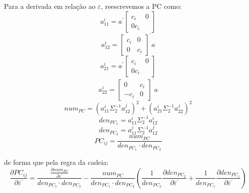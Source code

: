 \documentclass[a4paper,10pt]{article}
\begin{document}
Para a derivada em relação ao $\varepsilon$, reescrevemos a PC como:
\begin{equation}
a_{11}^{i} = a^{'} \left[ \begin{array}{cc}
 c_{i} & 0 \\ 0 c_{i}
\end{array} \right]
\end{equation}
\begin{equation}
a_{12}^{i} = \left[ \begin{array}{cc}
 c_{i} & 0 \\ 0 & c_{i}
\end{array} \right]^{'} a
\end{equation}
\begin{equation}
a_{21}^{i} = a^{'} \left[ \begin{array}{cc}
 c_{i} & 0 \\ 0 c_{i}
\end{array} \right]
\end{equation}
\begin{equation}
a_{22}^{i} = \left[ \begin{array}{cc}
 0 & c_{i} \\ -c_{i} & 0
\end{array} \right]^{'} a
\end{equation}
\begin{equation}
num_{PC} = (a_{11}^{i} \Sigma_{2}^{-1} a_{12}^{j})^{2} + (a_{21}^{i} \Sigma_{2}^{-1} a_{22}^{j})^{2}
\end{equation}
\begin{equation}
den_{PC_{1}} = a_{11}^{i} \Sigma_{2}^{-1} a_{12}^{i}
\end{equation}
\begin{equation}
den_{PC_{2}} = a_{11}^{j} \Sigma_{2}^{-1} a_{12}^{j}
\end{equation}
\begin{equation}
PC_{ij} = \frac{num_{PC}}{den_{PC_{1}} \cdot den_{PC_{2}}}
\end{equation}

de forma que pela regra da cadeia:
\begin{equation}
\frac{\partial PC_{ij}}{\partial \varepsilon^{'}} = \frac{\frac{\partial num_{PC}}{\partial \varepsilon^{'}}}{den_{PC_{1}} \cdot den_{PC_{2}}} -
\frac{num_{PC}}{den_{PC_{1}} \cdot den_{PC_{2}}} \left( \frac{1}{den_{PC_{2}}} \frac{\partial den_{PC_{2}}}{\partial \varepsilon^{'}} +
 \frac{1}{den_{PC_{1}}} \frac{\partial den_{PC_{1}}}{\partial \varepsilon^{'}}  \right) 
\end{equation}
\end{document}
